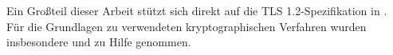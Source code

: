 Ein Großteil dieser Arbeit stützt sich direkt auf die TLS 1.2-Spezifikation in \cite{tls12}. Für die Grundlagen zu verwendeten kryptographischen Verfahren wurden insbesondere \cite{Schneier2006} und \cite{ferguson10} zu Hilfe genommen. 
